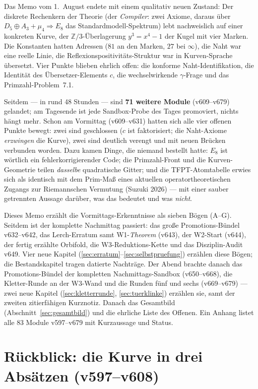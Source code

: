 \documentclass[11pt,a4paper]{article}
\begin{document}
Das Memo vom 1.~August endete mit einem qualitativ neuen Zustand: Der
diskrete Rechenkern der Theorie (der \emph{Compiler}: zwei Axiome,
daraus über $D_5 \oplus A_3 + \mu_4 \Rightarrow E_8$ das
Standardmodell-Spektrum) lebt nachweislich auf einer konkreten Kurve,
der $\mathbb{Z}/3$-Überlagerung $y^3 = x^4 - 1$ der Kugel mit vier
Marken. Die Konstanten hatten Adressen ($81$ an den Marken, $27$ bei
$\infty$), die Naht war eine reelle Linie, die
Reflexions\-positivitäts-Struktur war in Kurven-Sprache übersetzt.
Vier Punkte blieben ehrlich offen: die konforme Naht-Identifikation,
die Identität des Übersetzer-Elements $c$, die wechselwirkende
$\gamma$-Frage und das Primzahl-Problem~7.1.

Seitdem --- in rund 48 Stunden --- sind \textbf{71 weitere Module}
(v609--v679) gelandet; am Tagesende ist jede Sandbox-Probe des Tages
promoviert, nichts hängt mehr. Schon am Vormittag
(v609--v631) hatten sich alle vier offenen Punkte bewegt:
zwei sind geschlossen ($c$ ist faktorisiert; die Naht-Axiome
\emph{erzwingen} die Kurve), zwei sind deutlich verengt und mit neuen
Brücken verbunden worden. Dazu kamen Dinge, die niemand bestellt
hatte: $E_8$ ist wörtlich ein fehlerkorrigierender Code; die
Primzahl-Front und die Kurven-Geometrie teilen \emph{dasselbe}
quadratische Gitter; und die TFPT-Atomtabelle erwies sich als
identisch mit dem Prim-Maß eines aktuellen operatortheoretischen
Zugangs zur Riemannschen Vermutung (Suzuki 2026) --- mit einer sauber
getrennten Aussage darüber, was das bedeutet und was \emph{nicht}.

Dieses Memo erzählt die Vormittags-Erkenntnisse als sieben Bögen
(A--G). Seitdem ist der komplette Nachmittag passiert: das große
Promotions-Bündel v632--v642, das Lerch-Erratum samt W1-\emph{Theorem}
(v643), der W2-Start (v644), der fertig erzählte Orbifold, die
W3-Reduktions-Kette und das Disziplin-Audit v649. Vier neue Kapitel
(\ref{sec:erratum}--\ref{sec:selbstpruefung}) erzählen diese Bögen;
die Bestandskapitel tragen datierte Nachträge. Der Abend brachte
danach das Promotions-Bündel der kompletten Nachmittags-Sandbox
(v650--v668), die Kletter-Runde an der W3-Wand und die Runden fünf
und sechs (v669--v679) --- zwei neue Kapitel
(\ref{sec:kletterrunde}, \ref{sec:tuerklinke}) erzählen sie, samt
der zweiten zitierfähigen Kurznotiz. Danach das Gesamtbild
(Abschnitt~\ref{sec:gesamtbild}) und die ehrliche Liste des Offenen.
Ein Anhang listet alle 83 Module v597--v679 mit Kurzaussage und
Status.

\section{Rückblick: die Kurve in drei Absätzen (v597--v608)}
\end{document}
